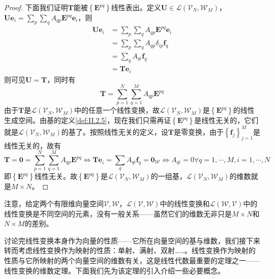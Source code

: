 \documentclass[main.tex]{subfiles}
\begin{document}
\begin{proof}
    下面我们证明$\mathbf{T}$能被$\left\{\mathbf{E}^{pq}\right\}$线性表出。定义$\mathbf{U}\in\mathcal{L}\left(\mathcal{V}_N,\mathcal{W}_M\right)$，$\mathbf{Ue}_i=\sum_p\sum_qA_{qp}\mathbf{E}^{pq}\mathbf{e}_i$，则
    \begin{align*}
        \mathbf{Ue}_i & =\sum_p\sum_qA_{qp}\mathbf{E}^{pq}\mathbf{e}_i \\
                      & =\sum_p\sum_qA_{qp}\delta_{ip}\mathbf{f}_q     \\
                      & =\sum_qA_{qi}\mathbf{f}_q                      \\
                      & =\mathbf{Te}_i
    \end{align*}
    则可见$\mathbf{U}=\mathbf{T}$，同时有
    \[\mathbf{T}=\sum_{p=1}^N\sum_{q=1}^MA_{qp}\mathbf{E}^{pq}\]
    由于$\mathbf{T}$是$\mathcal{L}\left(\mathcal{V}_N,\mathcal{W}_M\right)$中的任意一个线性变换，故$\mathcal{L}\left(\mathcal{V}_N,\mathcal{W}_M\right)$是$\left\{\mathbf{E}^{pq}\right\}$的线性生成空间。由基的定义\ref{def:II.2.5}，现在我们只需再证$\left\{\mathbf{E}^{pq}\right\}$是线性无关的，它们就是$\mathcal{L}\left(\mathcal{V}_N,\mathcal{W}_M\right)$的基了。按照线性无关的定义，设$\mathbf{T}$是零变换，由于$\left\{\mathbf{f}_j\right\}_{j=1}^M$是线性无关的，故有
    \[\mathbf{T}=\mathbf{0}=\sum_{p=1}^N\sum_{q=1}^MA_{qp}\mathbf{E}^{pq}\Leftrightarrow\mathbf{Te}_i=\sum_q A_{qi}\mathbf{f}_q=\mathbf{0}_{\mathcal{W}}\Leftrightarrow A_{qi}=0\forall q=1,\cdots,M,i=1,\cdots,N\]
    即$\left\{\mathbf{E}^{pq}\right\}$线性无关。故$\left\{\mathbf{E}^{pq}\right\}$是$\mathcal{L}\left(\mathcal{V}_N,\mathcal{W}_M\right)$的一组基，$\mathcal{L}\left(\mathcal{V}_N,\mathcal{W}_M\right)$的维数就是$M\times N$。
\end{proof}

注意，给定两个有限维向量空间$\mathcal{V},\mathcal{W}$，$\mathcal{L}\left(\mathcal{V},\mathcal{W}\right)$中的线性变换和$\mathcal{L}\left(\mathcal{W},\mathcal{V}\right)$中的线性变换是不同空间的元素，没有一般关系——虽然它们的维数无非只是$M\times N$和$N\times M$的差别。

讨论完线性变换本身作为向量的性质——它所在向量空间的基与维数，我们接下来转而考虑线性变换作为映射的性质：单射、满射、双射……。线性变换作为映射的性质与它所映射的两个向量空间的维数有关，这是线性代数最重要的定理之一——线性变换的维数定理。下面我们先为该定理的引入介绍一些必要概念。
\end{document}
